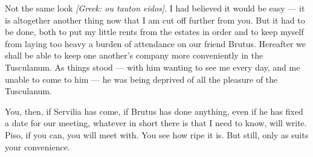 

 Not the same look \textit{[Greek: ou tauton eidos]}. I had believed it would be easy --- it is altogether another thing now that I am cut off further from you. But it had to be done, both to put my little rents from the estates in order and to keep myself from laying too heavy a burden of attendance on our friend Brutus. Hereafter we shall be able to keep one another's company more conveniently in the Tusculanum. As things stood --- with him wanting to see me every day, and me unable to come to him --- he was being deprived of all the pleasure of the Tusculanum.

 You, then, if Servilia has come, if Brutus has done anything, even if he has fixed a date for our meeting, whatever in short there is that I need to know, will write. Piso, if you can, you will meet with. You see how ripe it is. But still, only as suits your convenience.
